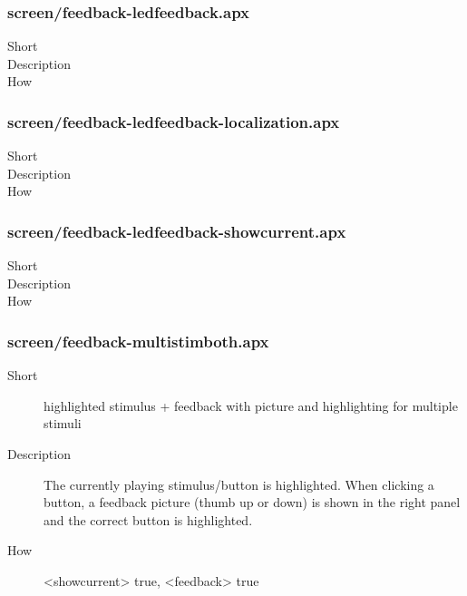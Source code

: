 \subsubsection{screen/feedback-ledfeedback.apx}
\begin{description}
\item[Short] 

\item[Description] 

\item[How] 

\end{description}

\subsubsection{screen/feedback-ledfeedback-localization.apx}
\begin{description}
\item[Short] 

\item[Description] 

\item[How] 

\end{description}

\subsubsection{screen/feedback-ledfeedback-showcurrent.apx}
\begin{description}
\item[Short] 

\item[Description] 

\item[How] 

\end{description}

\subsubsection{screen/feedback-multistimboth.apx}
\begin{description}
\item[Short] 
 highlighted stimulus + feedback with picture and highlighting for multiple stimuli
\item[Description] 
 The currently playing stimulus/button is highlighted. When clicking a button, a feedback picture (thumb up or down) is shown in the right panel and the correct button is highlighted.
\item[How] 
 \textless{}showcurrent\textgreater{} true, \textless{}feedback\textgreater{} true
\end{description}

